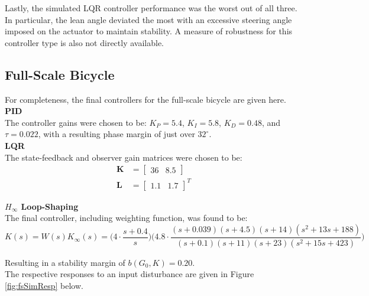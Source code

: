 Lastly, the simulated LQR controller performance was the worst out of all three. In particular, the lean angle deviated the most with an excessive steering angle imposed on the actuator to maintain stability. A measure of robustness for this controller type is also not directly available.

\subsection{Full-Scale Bicycle}
For completeness, the final controllers for the full-scale bicycle are given here. \\

\textbf{PID} \\
The controller gains were chosen to be: $K_P=5.4$, $K_I=5.8$, $K_D=0.48$, and $\tau=0.022$, with a resulting phase margin of just over $32^{\circ}$. \\

\newpage
\textbf{LQR} \\
The state-feedback and observer gain matrices were chosen to be:
\begin{align*}
\mathbf{K} &= \begin{bmatrix}
36 & 8.5
\end{bmatrix} \\
\mathbf{L} &= \begin{bmatrix}
1.1 & 1.7
\end{bmatrix}^T
\end{align*}

\textbf{$H_{\infty}$ Loop-Shaping} \\
The final controller, including weighting function, was found to be:
\begin{equation*}
K(s) = W(s) K_{\infty}(s) = \Big( 4 \cdot \frac{s+0.4}{s} \Big) \Big(4.8 \cdot \frac{(s+0.039)(s+4.5)(s+14)(s^2+13s+188)}{(s+0.1)(s+11)(s+23)(s^2+15s+423)} \Big)
\end{equation*}

Resulting in a stability margin of $b(G_0,K)=0.20$. \\

The respective responses to an input disturbance are given in Figure \ref{fig:fsSimResp} below.

